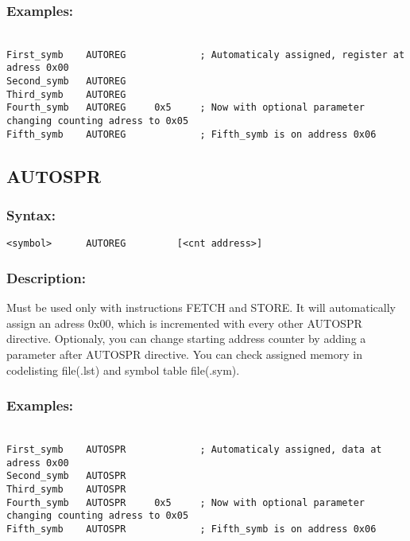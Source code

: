         \subsubsection{Examples:}
            {
                ~\\
                \usecodefont
                \verb'First_symb    AUTOREG             ; Automaticaly assigned, register at adress 0x00'\\
                \verb'Second_symb   AUTOREG'\\
                \verb'Third_symb    AUTOREG'\\
                \verb'Fourth_symb   AUTOREG     0x5     ; Now with optional parameter changing counting adress to 0x05'\\
                \verb'Fifth_symb    AUTOREG             ; Fifth_symb is on address 0x06'\\
            }
            
    \subsection{AUTOSPR}
        \subsubsection{Syntax:}
            \verb'<symbol>      AUTOREG         [<cnt address>]'
           
    \subsubsection{Description:}
    Must be used only with instructions FETCH and STORE. It will automatically assign an
    adress 0x00, which is incremented with every other AUTOSPR directive. Optionaly, you can change starting address counter by adding a parameter
    after AUTOSPR directive. You can check assigned memory in codelisting file(.lst) and symbol table file(.sym).

    \subsubsection{Examples:}
        {
            ~\\
            \usecodefont
            \verb'First_symb    AUTOSPR             ; Automaticaly assigned, data at adress 0x00'\\
            \verb'Second_symb   AUTOSPR'\\
            \verb'Third_symb    AUTOSPR'\\
            \verb'Fourth_symb   AUTOSPR     0x5     ; Now with optional parameter changing counting adress to 0x05'\\
            \verb'Fifth_symb    AUTOSPR             ; Fifth_symb is on address 0x06'\\
        }
            
